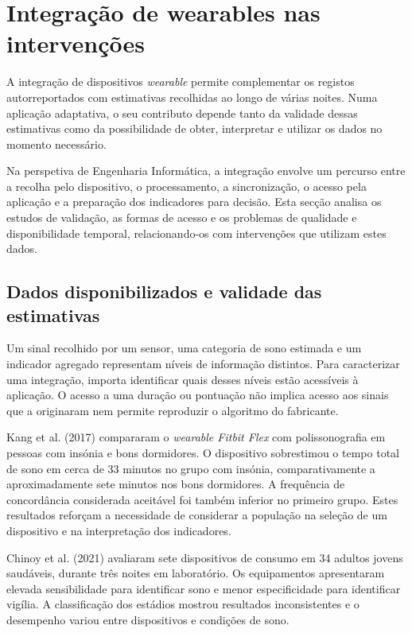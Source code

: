 \section{Integração de wearables nas intervenções}
\label{sec:chap3_integrateWearables}

A integração de dispositivos \textit{wearable} permite complementar os registos autorreportados com estimativas recolhidas ao longo de várias noites. Numa aplicação adaptativa, o seu contributo depende tanto da validade dessas estimativas como da possibilidade de obter, interpretar e utilizar os dados no momento necessário.

Na perspetiva de Engenharia Informática, a integração envolve um percurso entre a recolha pelo dispositivo, o processamento, a sincronização, o acesso pela aplicação e a preparação dos indicadores para decisão. Esta secção analisa os estudos de validação, as formas de acesso e os problemas de qualidade e disponibilidade temporal, relacionando-os com intervenções que utilizam estes dados.

\subsection{Dados disponibilizados e validade das estimativas}
\label{sec:chap3_wearableValidity}

Um sinal recolhido por um sensor, uma categoria de sono estimada e um indicador agregado representam níveis de informação distintos. Para caracterizar uma integração, importa identificar quais desses níveis estão acessíveis à aplicação. O acesso a uma duração ou pontuação não implica acesso aos sinais que a originaram nem permite reproduzir o algoritmo do fabricante.

Kang et al. (2017) compararam o \textit{wearable Fitbit Flex} com polissonografia em pessoas com insónia e bons dormidores. O dispositivo sobrestimou o tempo total de sono em cerca de 33 minutos no grupo com insónia, comparativamente a aproximadamente sete minutos nos bons dormidores. A frequência de concordância considerada aceitável foi também inferior no primeiro grupo. Estes resultados reforçam a necessidade de considerar a população na seleção de um dispositivo e na interpretação dos indicadores.

Chinoy et al. (2021) avaliaram sete dispositivos de consumo em 34 adultos jovens saudáveis, durante três noites em laboratório. Os equipamentos apresentaram elevada sensibilidade para identificar sono e menor especificidade para identificar vigília. A classificação dos estádios mostrou resultados inconsistentes e o desempenho variou entre dispositivos e condições de sono.

